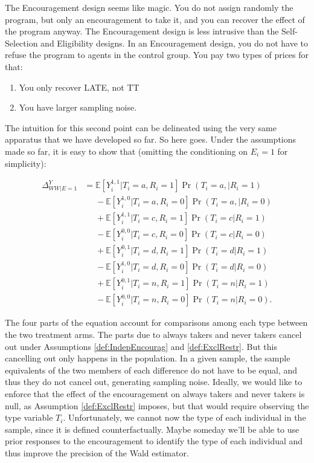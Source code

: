 \documentclass[]{book}
\providecommand{\tightlist}{%
  \setlength{\itemsep}{0pt}\setlength{\parskip}{0pt}}
\newcommand{\esp}[1]{\mathbb{E}[ #1 ]}
\theoremstyle{definition}
\theoremstyle{definition}
\theoremstyle{definition}
\theoremstyle{remark}
\let\BeginKnitrBlock\begin \let\EndKnitrBlock\end
\begin{document}
\BeginKnitrBlock{remark}
\iffalse{} {Remark. } \fi{}The Encouragement design seems like magic.
You do not assign randomly the program, but only an encouragement to
take it, and you can recover the effect of the program anyway. The
Encouragement design is less intrusive than the Self-Selection and
Eligibility designs. In an Encouragement design, you do not have to
refuse the program to agents in the control group. You pay two types of
prices for that:
\EndKnitrBlock{remark}

\begin{enumerate}
\def\labelenumi{\arabic{enumi}.}
\tightlist
\item
  You only recover LATE, not TT
\item
  You have larger sampling noise.
\end{enumerate}

The intuition for this second point can be delineated using the very
same apparatus that we have developed so far. So here goes. Under the
assumptions made so far, it is easy to show that (omitting the
conditioning on \(E_i=1\) for simplicity):

\begin{align*}
  \Delta^Y_{WW|E=1} & = \esp{Y_i^{1,1}|T_i=a,R_i=1}\Pr(T_i=a,|R_i=1)\\
                    & \phantom{=}-\esp{Y_i^{1,0}|T_i=a,R_i=0}\Pr(T_i=a,|R_i=0)\\
                    & \phantom{=}+ \esp{Y_i^{1,1}|T_i=c,R_i=1}\Pr(T_i=c|R_i=1)\\
                    & \phantom{=}-\esp{Y_i^{0,0}|T_i=c,R_i=0}\Pr(T_i=c|R_i=0)\\
                    & \phantom{=}+ \esp{Y_i^{0,1}|T_i=d,R_i=1}\Pr(T_i=d|R_i=1)\\
                    & \phantom{=}-\esp{Y_i^{1,0}|T_i=d,R_i=0}\Pr(T_i=d|R_i=0)\\
                    & \phantom{=}+ \esp{Y_i^{0,1}|T_i=n,R_i=1}\Pr(T_i=n|R_i=1)\\
                    & \phantom{=}-\esp{Y_i^{0,0}|T_i=n,R_i=0}\Pr(T_i=n|R_i=0).
\end{align*}

The four parts of the equation account for comparisons among each type
between the two treatment arms. The parts due to always takers and never
takers cancel out under Assumptions \ref{def:IndepEncourag} and
\ref{def:ExclRestr}. But this cancelling out only happens in the
population. In a given sample, the sample equivalents of the two members
of each difference do not have to be equal, and thus they do not cancel
out, generating sampling noise. Ideally, we would like to enforce that
the effect of the encouragement on always takers and never takers is
null, as Assumption \ref{def:ExclRestr} imposes, but that would require
observing the type variable \(T_i\). Unfortunately, we cannot now the
type of each individual in the sample, since it is defined
counterfactually. Maybe someday we'll be able to use prior responses to
the encouragement to identify the type of each individual and thus
improve the precision of the Wald estimator.
\end{document}

